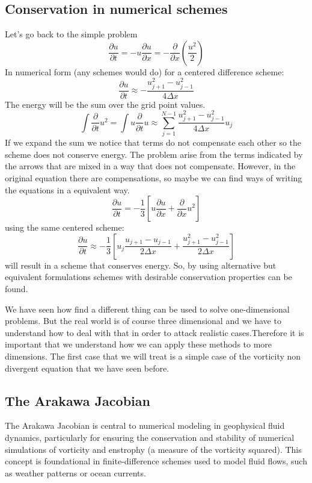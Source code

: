 \subsection{Conservation in numerical schemes}
Let's go back to the simple problem
\begin{equation}
	\frac{\partial u}{\partial t}=-u\frac{\partial u}{\partial x}=-\frac{\partial}{\partial x}\left(\frac{u^2}{2}\right)
\end{equation}
In numerical form (any schemes would do) for a centered difference scheme:
\begin{equation}
	\frac{\partial u}{\partial t}\approx -\frac{u^2_{j+1}-u^2_{j-1}}{4\Delta x}
\end{equation}
The energy will be the sum over the grid point values.
\begin{equation}
	\int\frac{\partial}{\partial t}u^2=\int u\frac{\partial}{\partial t}u\approx\displaystyle\sum_{j=1}^{N-1}\frac{u^2_{j+1}-u^2_{j-1}}{4\Delta x}u_j
\end{equation}
If we expand the sum we notice that terms do not compensate each other so the scheme does not conserve energy. The problem arise from the terms indicated by the arrows that are mixed in a way that does not compensate. However, in the original equation there are compensations, so maybe we can find ways of writing the equations in a equivalent way.
$$
	\frac{\partial u}{\partial t}=-\frac{1}{3}\left[u\frac{\partial u}{\partial x}+\frac{\partial}{\partial x}u^2\right]
$$
using the same centered scheme:
$$\frac{\partial u}{\partial t}\approx -\frac{1}{3}\left[u_j\frac{u_{j+1}-u_{j-1}}{2\Delta x}+\frac{u^2_{j+1}-u^2_{j-1}}{2\Delta x}\right]
$$
will result in a scheme that conserves energy. So, by using alternative but equivalent formulations schemes with desirable conservation properties can be found.

We have seen how find a different thing can be used to solve one-dimensional problems. But the real world is of course three dimensional and we have to understand how to deal with that in order to attack realistic cases.Therefore it is important that we understand how we can apply these methods to more dimensions. The first case that we will treat is a simple case of the vorticity non divergent equation that we have seen before.
\subsection{The Arakawa Jacobian}
The Arakawa Jacobian is central to numerical modeling in geophysical fluid dynamics, particularly for ensuring the conservation and stability of numerical simulations of vorticity and enstrophy (a measure of the vorticity squared). This concept is foundational in finite-difference schemes used to model fluid flows, such as weather patterns or ocean currents.



